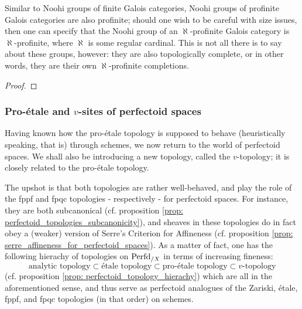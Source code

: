                     \begin{lemma} \label{lemma: profiniteness_of_noohi_groups_reprised}
                        Similar to Noohi groups of finite Galois categories, Noohi groups of profinite Galois categories are also profinite; should one wish to be careful with size issues, then one can specify that the Noohi group of an $\aleph$-profinite Galois category is $\aleph$-profinite, where $\aleph$ is some regular cardinal. This is not all there is to say about these groups, however: they are also topologically complete, or in other words, they are their own $\aleph$-profinite completions.
                    \end{lemma}
                        \begin{proof}
                            
                        \end{proof}
                        
                    \begin{proposition} \label{prop: pro_etale_galois_groups}
                        
                    \end{proposition}
                    
            \subsubsection{Pro-\'etale and \texorpdfstring{$v$}{}-sites of perfectoid spaces} \label{subsubsection: pro_etale_sites_and_v_sites_of_perfectoid_spaces}
                Having known how the pro-\'etale topology is supposed to behave (heuristically speaking, that is) through schemes, we now return to the world of perfectoid spaces. We shall also be introducing a new topology, called the $v$-topology; it is closely related to the pro-\'etale topology.
                
                The upshot is that both topologies are rather well-behaved, and play the role of the fppf and fpqc topologies - respectively - for perfectoid spaces. For instance, they are both subcanonical (cf. proposition \ref{prop: perfectoid_topologies_subcanonicity}), and sheaves in these topologies do in fact obey a (weaker) version of Serre's Criterion for Affineness (cf. proposition \ref{prop: serre_affineness_for_perfectoid_spaces}). As a matter of fact, one has the following hierachy of topologies on $\mathrm{Perfd}_{/X}$ in terms of increasing fineness:
                    $$\text{analytic topology} \subset \text{\'etale topology} \subset \text{pro-\'etale topology} \subset \text{$v$-topology}$$
                (cf. proposition \ref{prop: perfectoid_topology_hierachy}) which are all  in the aforementioned sense, and thus serve as perfectoid analogues of the Zariski, \'etale, fppf, and fpqc topologies (in that order) on schemes. 
                

